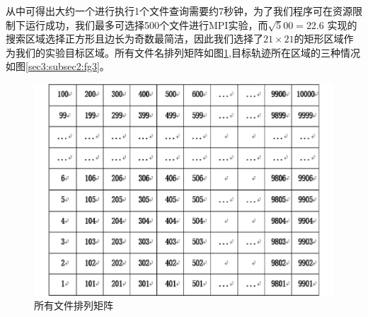 \documentclass[UTF8]{ctexart}
\begin{document}
从中可得出大约一个进行执行1个文件查询需要约7秒钟，为了我们程序可在资源限制下运行成功，我们最多可选择500个文件进行MPI实验，而$\surd500=22.6$
实现的搜索区域选择正方形且边长为奇数最简洁，因此我们选择了$21\times21$的矩形区域作为我们的实验目标区域。所有文件名排列矩阵如图\ref{sec3:subsec2:fg2},目标轨迹所在区域的三种情况如图\ref{sec3:subsec2:fg3}。

\begin{figure}[!htbp]
  \begin{minipage}[t]{0.5\linewidth}
    \centering
    \includegraphics[width=\textwidth]{fig/fig03.pdf}
    \caption{所有文件排列矩阵 \label{sec3:subsec2:fg2}}
  \end{minipage}
  \hfill
  \begin{minipage}[t]{0.45\linewidth}
    \centering

\end{minipage}
\end{figure}
\end{document}

